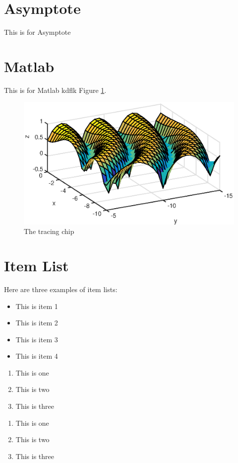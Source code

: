\documentclass[12pt,a4paper]{report}
\begin{document}
\section{Asymptote}
This is for Asymptote

\section{Matlab}
This is for Matlab kdflk Figure \ref{fig1}.



\begin{figure}[ht!] 
\begin{center}
\includegraphics[scale=1.2]{f1}
\caption{The tracing chip}
\label{fig1}
\end{center}
\end{figure}


\section{Item List}
Here are three examples of item lists:
\begin{itemize}\itemsep -2pt
\item This is item 1
\item This is item 2
\item This is item 3
\item This is item 4
\end{itemize}

\begin{enumerate}\itemsep -2pt
\item This is one
\item This is two
\item This is three
\end{enumerate}

\begin{enumerate}[1.]\itemsep -2pt
\item This is one
\item This is two
\item This is three
\end{enumerate}
\end{document}
